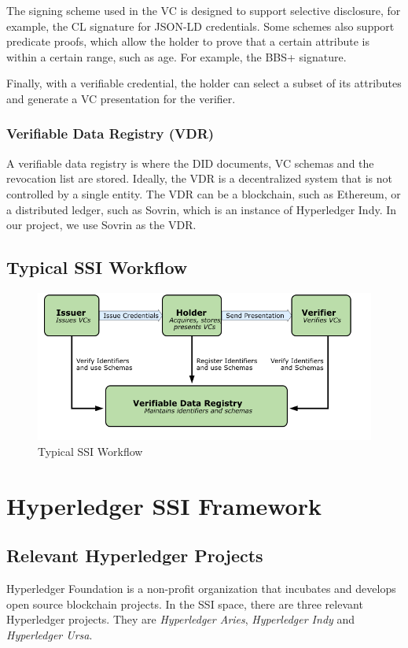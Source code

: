 \documentclass[
]{report}
\begin{document}
The signing scheme used in the VC is designed to support selective disclosure,
for example, the CL signature for JSON-LD credentials. Some schemes also 
support predicate proofs, which allow the holder to prove that a certain
attribute is within a certain range, such as age. For example, the BBS+ 
signature.

Finally, with a verifiable credential, the holder can select a subset of its
attributes and generate a VC presentation for the verifier.

\subsubsection{Verifiable Data Registry (VDR)}
A verifiable data registry is where the DID documents, VC schemas and the
revocation list are stored. Ideally, the VDR is a decentralized system that
is not controlled by a single entity. The VDR can be a blockchain, such as
Ethereum, or a distributed ledger, such as Sovrin, which is an instance of
Hyperledger Indy. In our project, we use Sovrin as the VDR.

\subsection{Typical SSI Workflow}

\begin{figure}
\centering
\includegraphics[width=12cm]{ssi.png}
\caption{Typical SSI Workflow}
\end{figure}

\section{Hyperledger SSI Framework}

\subsection{Relevant Hyperledger Projects}
Hyperledger Foundation is a non-profit organization that incubates and
develops open source blockchain projects. In the SSI space, there are three
relevant Hyperledger projects. They are \emph{Hyperledger Aries},
\emph{Hyperledger Indy} and \emph{Hyperledger Ursa}.
\end{document}
